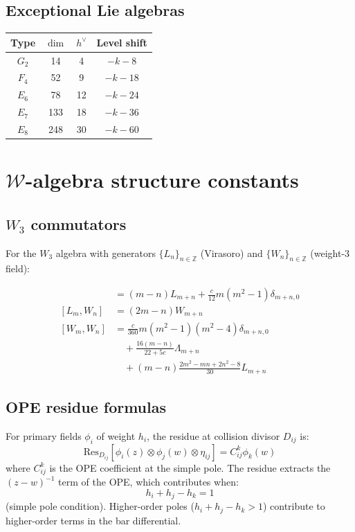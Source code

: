 \subsection{Exceptional Lie algebras}

\begin{center}
\begin{tabular}{|c|c|c|c|}
\hline
Type & $\dim$ & $h^\vee$ & Level shift \\
\hline
$G_2$ & 14 & 4 & $-k-8$ \\
\hline
$F_4$ & 52 & 9 & $-k-18$ \\
\hline
$E_6$ & 78 & 12 & $-k-24$ \\
\hline
$E_7$ & 133 & 18 & $-k-36$ \\
\hline
$E_8$ & 248 & 30 & $-k-60$ \\
\hline
\end{tabular}
\end{center}

\section{$\mathcal{W}$-algebra structure constants}

\subsection{\texorpdfstring{$W_3$ commutators}{W 3 commutators}}

For the $W_3$ algebra with generators $\{L_n\}_{n \in \mathbb{Z}}$ (Virasoro) and $\{W_n\}_{n \in \mathbb{Z}}$ (weight-3 field):

\begin{align}
[L_m, L_n] &= (m-n)L_{m+n} + \frac{c}{12}m(m^2-1)\delta_{m+n,0} \\
[L_m, W_n] &= (2m-n)W_{m+n} \\
[W_m, W_n] &= \frac{c}{360}m(m^2-1)(m^2-4)\delta_{m+n,0} \\
&\quad + \frac{16(m-n)}{22+5c}\Lambda_{m+n} \\
&\quad + (m-n)\frac{2m^2 - mn + 2n^2 - 8}{30}L_{m+n}
\end{align}

\subsection{OPE residue formulas}

For primary fields $\phi_i$ of weight $h_i$, the residue at collision divisor $D_{ij}$ is:
\[\text{Res}_{D_{ij}}[\phi_i(z) \otimes \phi_j(w) \otimes \eta_{ij}] = C^k_{ij} \phi_k(w)\]
where $C^k_{ij}$ is the OPE coefficient at the simple pole.  The residue extracts the $(z-w)^{-1}$ term of the OPE, which contributes when:
\[h_i + h_j - h_k = 1\]
(simple pole condition).  Higher-order poles ($h_i + h_j - h_k > 1$) contribute to higher-order terms in the bar differential.

